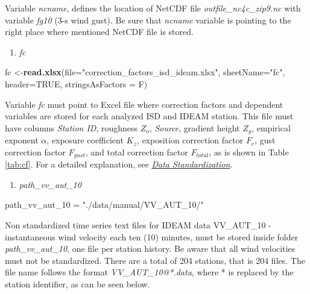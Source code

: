 \documentclass[12pt,twoside]{reedthesis}
\newenvironment{Shaded}{\begin{snugshade}}{\end{snugshade}}
\newcommand{\DataTypeTok}[1]{\textcolor[rgb]{0.13,0.29,0.53}{#1}}
\newcommand{\DecValTok}[1]{\textcolor[rgb]{0.00,0.00,0.81}{#1}}
\newcommand{\KeywordTok}[1]{\textcolor[rgb]{0.13,0.29,0.53}{\textbf{#1}}}
\newcommand{\NormalTok}[1]{#1}
\newcommand{\OtherTok}[1]{\textcolor[rgb]{0.56,0.35,0.01}{#1}}
\newcommand{\StringTok}[1]{\textcolor[rgb]{0.31,0.60,0.02}{#1}}
\providecommand{\tightlist}{%
  \setlength{\itemsep}{0pt}\setlength{\parskip}{0pt}}
\begin{document}
Variable \emph{ncname}, defines the location of NetCDF file \emph{outfile\_nc4c\_zip9.nc} with variable \emph{fg10} (3-s wind gust). Be sure that \emph{ncname} variable is pointing to the right place where mentioned NetCDF file is stored.
\begin{enumerate}
\def\labelenumi{\arabic{enumi}.}
\setcounter{enumi}{3}
\tightlist
\item
  \emph{fc}
\end{enumerate}
\scriptsize

\vspace{0.4cm}
\begin{Shaded}
\begin{Highlighting}[]
\NormalTok{      fc <-}\KeywordTok{read.xlsx}\NormalTok{(}\DataTypeTok{file=}\StringTok{"correction_factors_isd_ideam.xlsx"}\NormalTok{, }\DataTypeTok{sheetName=}\StringTok{"fc"}\NormalTok{, }\DataTypeTok{header=}\OtherTok{TRUE}\NormalTok{, }
                     \DataTypeTok{stringsAsFactors =}\NormalTok{ F)}
\end{Highlighting}
\end{Shaded}
\normalsize

Variable \emph{fc} must point to Excel file where correction factors and dependent variables are stored for each analyzed ISD and IDEAM station. This file must have columns \emph{Station ID}, roughness \(Z_o\), \emph{Source}, gradient height \(Z_g\), empirical exponent \(\alpha\), exposure coefficient \(K_z\), exposition correction factor \(F_e\), gust correction factor \(F_{gust}\), and total correction factor \(F_{total}\), as is shown in Table \ref{tab:cf}. For a detailed explanation, see \emph{\protect\hyperlink{rmd-standardization}{Data Standardization}}.
\begin{enumerate}
\def\labelenumi{\arabic{enumi}.}
\setcounter{enumi}{4}
\tightlist
\item
  \emph{path\_vv\_aut\_10}
\end{enumerate}
\scriptsize

\vspace{0.4cm}
\begin{Shaded}
\begin{Highlighting}[]
\NormalTok{      path_vv_aut_}\DecValTok{10}\NormalTok{ =}\StringTok{ "./data/manual/VV_AUT_10/"}
\end{Highlighting}
\end{Shaded}
\normalsize

Non standardized time series text files for IDEAM data VV\_AUT\_10 - instantaneous wind velocity each ten (10) minutes, must be stored inside folder \emph{path\_vv\_aut\_10}, one file per station history. Be aware that all wind velocities must not be standardized. There are a total of 204 stations, that is 204 files. The file name follows the format \emph{VV\_AUT\_10@*.data}, where * is replaced by the station identifier, as can be seen below.
\end{document}
